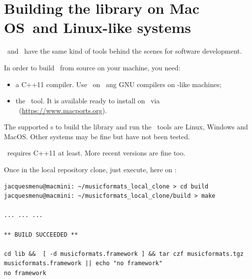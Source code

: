 \section{Building the library on Mac OS\texttrademark\ and Linux-like systems}

\MacOS\ and \Linux\ have the same kind of tools behind the scenes for software development.

In order to build \mf\ from source on your machine, you need:
\begin{itemize}
\item a C++11 compiler. Use \xcode\ on \MacOS\ ang GNU compilers on \Unix -like machines;
\item the \cmake\ tool. It is available ready to install on \MacOS\ via \macports\ (\url{https://www.macports.org}).
\end{itemize}

The supported \OS s to build the library and run the \CLI\ tools are Linux, Windows and MacOS. Other systems may be fine but have not been tested.

\mf\ requires C++11 at least. More recent versions are fine too.

Once in the local repository clone, just execute, here on \MacOS:
\begin{lstlisting}[language=Terminal]
jacquesmenu@macmini: ~/musicformats_local_clone > cd build
jacquesmenu@macmini: ~/musicformats_local_clone/build > make

... ... ...

** BUILD SUCCEEDED **

cd lib &&  [ -d musicformats.framework ] && tar czf musicformats.tgz musicformats.framework || echo "no framework"
no framework
\end{lstlisting}

